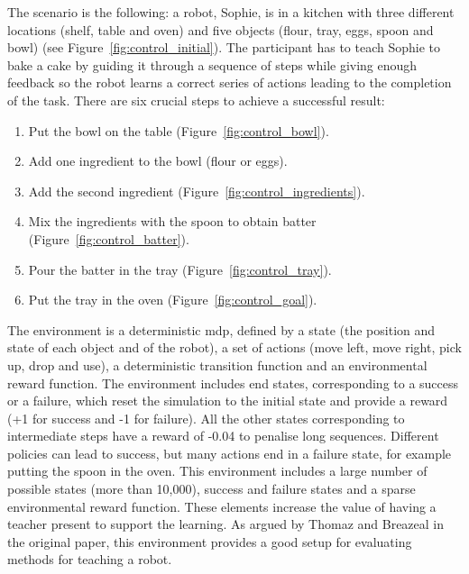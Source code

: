 The scenario is the following: a robot, Sophie, is in a kitchen with three different locations (shelf, table and oven) and five objects (flour, tray, eggs, spoon and bowl) (see Figure~\ref{fig:control_initial}). The participant has to teach Sophie to bake a cake by guiding it through a sequence of steps while giving enough feedback so the robot learns a correct series of actions leading to the completion of the task. There are six crucial steps to achieve a successful result:

\begin{enumerate}
	\item Put the bowl on the table (Figure~\ref{fig:control_bowl}).
	\item Add one ingredient to the bowl (flour or eggs).
	\item Add the second ingredient (Figure~\ref{fig:control_ingredients}).
	\item Mix the ingredients with the spoon to obtain batter (Figure~\ref{fig:control_batter}).
	\item Pour the batter in the tray (Figure~\ref{fig:control_tray}).
	\item Put the tray in the oven (Figure~\ref{fig:control_goal}).
\end{enumerate}

The environment is a deterministic \gls{mdp}, defined by a state (the position and state of each object and of the robot), a set of actions (move left, move right, pick up, drop and use), a deterministic transition function and an environmental reward function. The environment includes end states, corresponding to a success or a failure, which reset the simulation to the initial state and provide a reward (+1 for success and -1 for failure). All the other states corresponding to intermediate steps have a reward of -0.04 to penalise long sequences. Different policies can lead to success, but many actions end in a failure state, for example putting the spoon in the oven. This environment includes a large number of possible states (more than 10,000), success and failure states and a sparse environmental reward function. These elements increase the value of having a teacher present to support the learning. As argued by Thomaz and Breazeal in the original paper, this environment provides a good setup for evaluating methods for teaching a robot.

